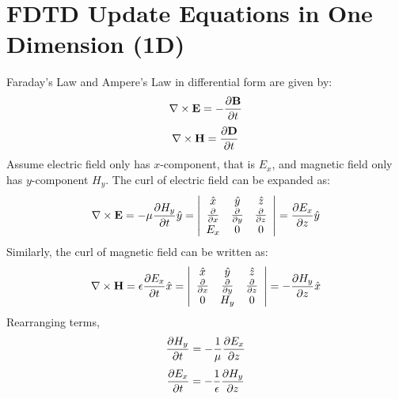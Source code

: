 \section{FDTD Update Equations in One Dimension (1D)}
Faraday's Law and Ampere's Law in differential form are given by:
\begin{equation}
\centering
\nabla \times \textbf{E} = - \dfrac{\partial \textbf{B}}{\partial t}
\label{Faraday's Law}
\end{equation}
\begin{equation}
\centering
\nabla \times \textbf{H} = \dfrac{\partial \textbf{D}}{\partial t}
\label{Ampere's Law}
\end{equation}
Assume electric field only has $x$-component, that is $E_x$, and magnetic field only has $y$-component $H_y$. The curl of electric field can be expanded as:
\begin{equation}
\centering
\nabla \times \textbf{E} = - \mu \dfrac{\partial H_y}{\partial t} \hat{y} = \left| \begin{array}{ccc} \hat{x} & \hat{y} & \hat{z} \\ \frac{\partial}{\partial x} & \frac{\partial}{\partial y} & \frac{\partial}{\partial z} \\ E_x & 0 & 0 \end{array} \right| = \dfrac{\partial E_x}{\partial z} \hat{y}
\label{Faraday's Law-Curl-Expansion}
\end{equation}
Similarly, the curl of magnetic field can be written as:
\begin{equation}
\centering
\nabla \times \textbf{H} = \epsilon \dfrac{\partial E_x}{\partial t} \hat{x} = \left| \begin{array}{ccc} \hat{x} & \hat{y} & \hat{z} \\ \frac{\partial}{\partial x} & \frac{\partial}{\partial y} & \frac{\partial}{\partial z} \\ 0 & H_y & 0 \end{array} \right| = - \dfrac{\partial H_y}{\partial z} \hat{x}
\label{Ampere's Law-Curl-Expansion}
\end{equation}
Rearranging terms,
\begin{equation}
\centering
\dfrac{\partial H_y}{\partial t} = - \dfrac{1}{\mu} \dfrac{\partial E_x}{\partial z}
\label{Faraday's Law-Curl-Expansion-1D}
\end{equation}
\begin{equation}
\centering
\dfrac{\partial E_x}{\partial t} = - \dfrac{1}{\epsilon} \dfrac{\partial H_y}{\partial z}
\label{Ampere's Law-Curl-Expansion-1D}
\end{equation}

